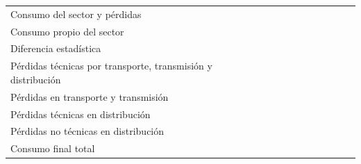 \documentclass{sener2025}
\begin{document}
\begin{tabladoradoLargo}
\begin{xltabular}{\textwidth}{QZZZZZZZZZZZZ}
    Consumo del sector y pérdidas &  &  &  &  &  &  &  &  &  &  &  &  \\
    \hspace{1.35em} Consumo propio del sector &  &  &  &  &  &  &  &  &  &  &  &  \\
    \hspace{1.35em} Diferencia estadística &  &  &  &  &  &  &  &  &  &  &  &  \\
    \hspace{1.35em} Pérdidas técnicas por transporte, transmisión y distribución &  &  &  &  &  &  &  &  &  &  &  &  \\
    \hspace{2.7em} Pérdidas en transporte y transmisión &  &  &  &  &  &  &  &  &  &  &  &  \\
    \hspace{2.7em} Pérdidas técnicas en distribución &  &  &  &  &  &  &  &  &  &  &  &  \\
    \hspace{2.7em} Pérdidas no técnicas  en distribución &  &  &  &  &  &  &  &  &  &  &  &  \\
    Consumo final total &  &  &  &  &  &  &  &  &  &  &  &  \\

\end{xltabular}
\end{tabladoradoLargo}
\end{document}
